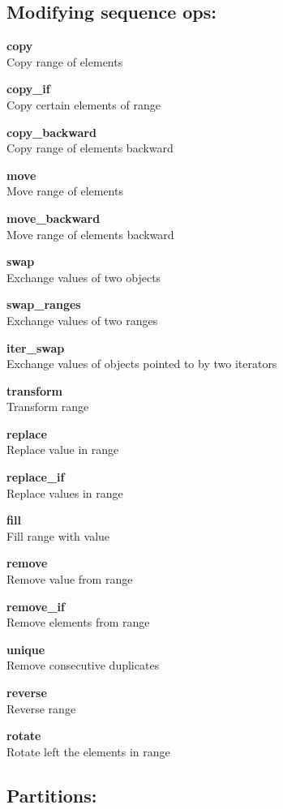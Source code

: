 \documentclass[table]{article}
\begin{document}
\begin{multicols}{2}
	\columnbreak
	
	\subsection*{Modifying sequence ops:}
	
	\textbf{copy}\\
	Copy range of elements
	
	\textbf{copy\_if}\\
	Copy certain elements of range
	
	\textbf{copy\_backward}\\
	Copy range of elements backward
	
	\textbf{move}\\
	Move range of elements
	
	\textbf{move\_backward}\\
	Move range of elements backward
	
	\textbf{swap}\\
	Exchange values of two objects
	
	\textbf{swap\_ranges}\\
	Exchange values of two ranges
	
	\textbf{iter\_swap}\\
	Exchange values of objects pointed to by two iterators
	
	\textbf{transform}\\
	Transform range
	
	\textbf{replace}\\
	Replace value in range
	
	\textbf{replace\_if}\\
	Replace values in range
	
	\textbf{fill}\\
	Fill range with value
	
	\textbf{remove}\\
	Remove value from range
	
	\textbf{remove\_if}\\
	Remove elements from range
	
	\textbf{unique}\\
	Remove consecutive duplicates
	
	\textbf{reverse}\\
	Reverse range
	
	\textbf{rotate}\\
	Rotate left the elements in range
	
	\columnbreak
	
	\subsection*{Partitions:}
	

\end{multicols}
\end{document}
